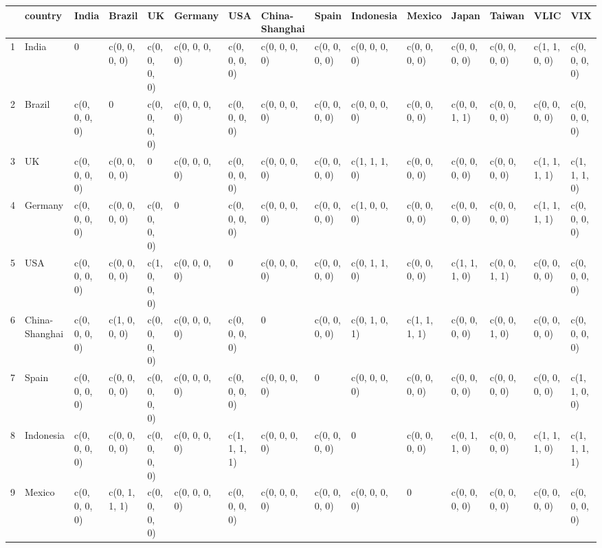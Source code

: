 \begin{table}[ht]
\centering
\begin{tabular}{lllllllllllllll}
  \hline
 & country & India & Brazil & UK & Germany & USA & China-Shanghai & Spain & Indonesia & Mexico & Japan & Taiwan & VLIC & VIX \\ 
  \hline
1 & India &             0 & c(0, 0, 0, 0) & c(0, 0, 0, 0) & c(0, 0, 0, 0) & c(0, 0, 0, 0) & c(0, 0, 0, 0) & c(0, 0, 0, 0) & c(0, 0, 0, 0) & c(0, 0, 0, 0) & c(0, 0, 0, 0) & c(0, 0, 0, 0) & c(1, 1, 0, 0) & c(0, 0, 0, 0) \\ 
  2 & Brazil & c(0, 0, 0, 0) &             0 & c(0, 0, 0, 0) & c(0, 0, 0, 0) & c(0, 0, 0, 0) & c(0, 0, 0, 0) & c(0, 0, 0, 0) & c(0, 0, 0, 0) & c(0, 0, 0, 0) & c(0, 0, 1, 1) & c(0, 0, 0, 0) & c(0, 0, 0, 0) & c(0, 0, 0, 0) \\ 
  3 & UK & c(0, 0, 0, 0) & c(0, 0, 0, 0) &             0 & c(0, 0, 0, 0) & c(0, 0, 0, 0) & c(0, 0, 0, 0) & c(0, 0, 0, 0) & c(1, 1, 1, 0) & c(0, 0, 0, 0) & c(0, 0, 0, 0) & c(0, 0, 0, 0) & c(1, 1, 1, 1) & c(1, 1, 1, 0) \\ 
  4 & Germany & c(0, 0, 0, 0) & c(0, 0, 0, 0) & c(0, 0, 0, 0) &             0 & c(0, 0, 0, 0) & c(0, 0, 0, 0) & c(0, 0, 0, 0) & c(1, 0, 0, 0) & c(0, 0, 0, 0) & c(0, 0, 0, 0) & c(0, 0, 0, 0) & c(1, 1, 1, 1) & c(0, 0, 0, 0) \\ 
  5 & USA & c(0, 0, 0, 0) & c(0, 0, 0, 0) & c(1, 0, 0, 0) & c(0, 0, 0, 0) &             0 & c(0, 0, 0, 0) & c(0, 0, 0, 0) & c(0, 1, 1, 0) & c(0, 0, 0, 0) & c(1, 1, 1, 0) & c(0, 0, 1, 1) & c(0, 0, 0, 0) & c(0, 0, 0, 0) \\ 
  6 & China-Shanghai & c(0, 0, 0, 0) & c(1, 0, 0, 0) & c(0, 0, 0, 0) & c(0, 0, 0, 0) & c(0, 0, 0, 0) &             0 & c(0, 0, 0, 0) & c(0, 1, 0, 1) & c(1, 1, 1, 1) & c(0, 0, 0, 0) & c(0, 0, 1, 0) & c(0, 0, 0, 0) & c(0, 0, 0, 0) \\ 
  7 & Spain & c(0, 0, 0, 0) & c(0, 0, 0, 0) & c(0, 0, 0, 0) & c(0, 0, 0, 0) & c(0, 0, 0, 0) & c(0, 0, 0, 0) &             0 & c(0, 0, 0, 0) & c(0, 0, 0, 0) & c(0, 0, 0, 0) & c(0, 0, 0, 0) & c(0, 0, 0, 0) & c(1, 1, 0, 0) \\ 
  8 & Indonesia & c(0, 0, 0, 0) & c(0, 0, 0, 0) & c(0, 0, 0, 0) & c(0, 0, 0, 0) & c(1, 1, 1, 1) & c(0, 0, 0, 0) & c(0, 0, 0, 0) &             0 & c(0, 0, 0, 0) & c(0, 1, 1, 0) & c(0, 0, 0, 0) & c(1, 1, 1, 0) & c(1, 1, 1, 1) \\ 
  9 & Mexico & c(0, 0, 0, 0) & c(0, 1, 1, 1) & c(0, 0, 0, 0) & c(0, 0, 0, 0) & c(0, 0, 0, 0) & c(0, 0, 0, 0) & c(0, 0, 0, 0) & c(0, 0, 0, 0) &             0 & c(0, 0, 0, 0) & c(0, 0, 0, 0) & c(0, 0, 0, 0) & c(0, 0, 0, 0) \\ 

\end{tabular}
\end{table}
